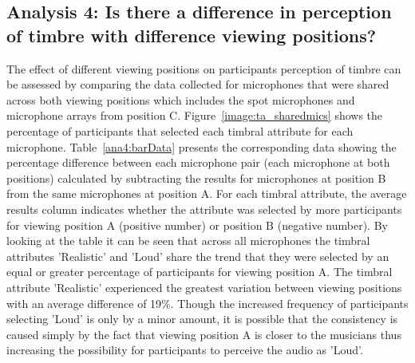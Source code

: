 















\subsection{Analysis 4: Is there a difference in perception of timbre with difference viewing positions?}
\label{ana4}
		
	The effect of different viewing positions on participants perception of timbre can be assessed by comparing the data collected for microphones that were shared across both viewing positions which includes the spot microphones and microphone arrays from position C. Figure~\ref{image:ta_sharedmics} shows the percentage of participants that selected each timbral attribute for each microphone. Table~\ref{ana4:barData} presents the corresponding data showing the percentage difference between each microphone pair (each microphone at both positions) calculated by subtracting the results for microphones at position B from the same microphones at position A. For each timbral attribute, the average results column indicates whether the attribute was selected by more participants for viewing position A (positive number) or position B (negative number). By looking at the table it can be seen that across all microphones the timbral attributes 'Realistic' and 'Loud' share the trend that they were selected by an equal or greater percentage of participants for viewing position A. The timbral attribute 'Realistic' experienced the greatest variation between viewing positions with an average difference of 19\%. Though the increased frequency of participants selecting 'Loud' is only by a minor amount, it is possible that the consistency is caused simply by the fact that viewing position A is closer to the musicians thus increasing the possibility for participants to perceive the audio as 'Loud'. \\

